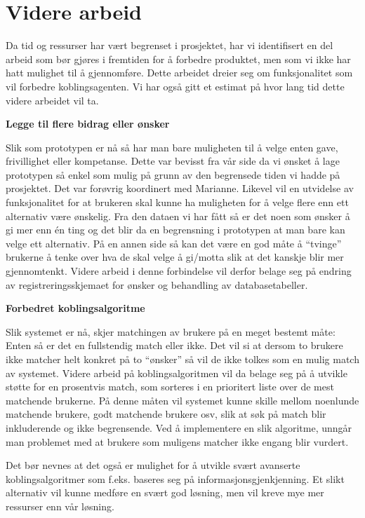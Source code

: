\section{Videre arbeid}
Da tid og ressurser har vært begrenset i prosjektet, har vi identifisert en del arbeid som bør gjøres i fremtiden for å forbedre produktet, men som vi ikke har hatt mulighet til å gjennomføre. Dette arbeidet dreier seg om funksjonalitet som vil forbedre koblingsagenten. Vi har også gitt et estimat på hvor lang tid dette videre arbeidet vil ta.

{\bf Legge til flere bidrag eller ønsker}

Slik som prototypen er nå så har man bare muligheten til å velge enten gave, frivillighet eller kompetanse. Dette var bevisst fra vår side da vi ønsket å lage prototypen så enkel som mulig på grunn av den begrensede tiden vi hadde på prosjektet. Det var forøvrig koordinert med Marianne. Likevel vil en utvidelse av funksjonalitet for at brukeren skal kunne ha muligheten for å velge flere enn ett alternativ være ønskelig. Fra den dataen vi har fått så er det noen som ønsker å gi mer enn én ting og det blir da en begrensning i prototypen at man bare kan velge ett alternativ. På en annen side så kan det være en god måte å ``tvinge'' brukerne å tenke over hva de skal velge å gi/motta slik at det kanskje blir mer gjennomtenkt. Videre arbeid i denne forbindelse vil derfor belage seg på endring av registreringsskjemaet for ønsker og behandling av databasetabeller.

{\bf Forbedret koblingsalgoritme}

Slik systemet er nå, skjer matchingen av brukere på en meget bestemt måte: Enten så er det en fullstendig match eller ikke. Det vil si at dersom to brukere ikke matcher helt konkret på to ``ønsker'' så vil de ikke tolkes som en mulig match av systemet. Videre arbeid på koblingsalgoritmen vil da belage seg på å utvikle støtte for en prosentvis match, som sorteres i en prioritert liste over de mest matchende brukerne. På denne måten vil systemet kunne skille mellom noenlunde matchende brukere, godt matchende brukere osv, slik at søk på match blir inkluderende og ikke begrensende. Ved å implementere en slik algoritme, unngår man problemet med at brukere som muligens matcher ikke engang blir vurdert.

Det bør nevnes at det også er mulighet for å utvikle svært avanserte koblingsalgoritmer som f.eks. baseres seg på informasjonsgjenkjenning. Et slikt alternativ vil kunne medføre en svært god løsning, men vil kreve mye mer ressurser enn vår løsning.

